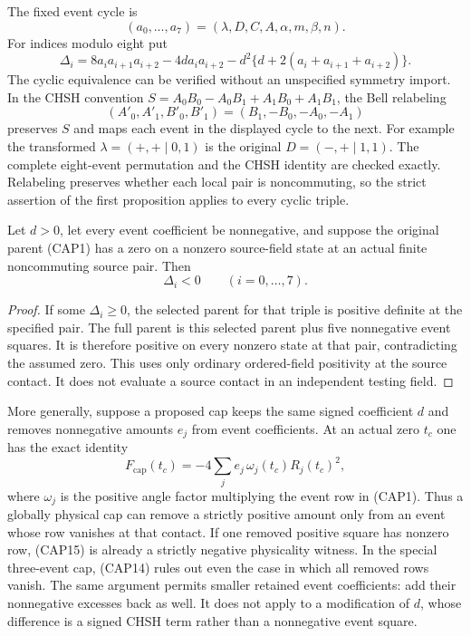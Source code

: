 The fixed event cycle is
\[
(a_0,\ldots,a_7)=(\lambda,D,C,A,\alpha,m,\beta,n).
\]
For indices modulo eight put
\[
\Delta_i=8a_i a_{i+1}a_{i+2}-4d a_i a_{i+2}
 -d^2\{d+2(a_i+a_{i+1}+a_{i+2})\}.
\tag{CAP12}
\]
The cyclic equivalence can be verified without an unspecified symmetry
import.  In the CHSH convention
$S=A_0B_0-A_0B_1+A_1B_0+A_1B_1$, the Bell relabeling
\[
(A'_0,A'_1,B'_0,B'_1)=(B_1,-B_0,-A_0,-A_1)
\tag{CAP13}
\]
preserves $S$ and maps each event in the displayed cycle to the next.
For example the transformed $\lambda=(+,+\mid0,1)$ is the original
$D=(-,+\mid1,1)$.  The complete eight-event permutation and the CHSH
identity are checked exactly.  Relabeling preserves whether each local
pair is noncommuting, so the strict assertion of the first proposition
applies to every cyclic triple.

\begin{theorem}
Let $d>0$, let every event coefficient be nonnegative, and suppose
the original parent (CAP1) has a zero on a nonzero source-field state
at an actual finite noncommuting source pair.  Then
\[
\Delta_i<0\qquad (i=0,\ldots,7).
\tag{CAP14}
\]
\end{theorem}

\begin{proof}
If some $\Delta_i\geq0$, the selected parent for that triple is
positive definite at the specified pair.  The full parent is this
selected parent plus five nonnegative event squares.  It is therefore
positive on every nonzero state at that pair, contradicting the
assumed zero.  This uses only ordinary ordered-field positivity at
the source contact.  It does not evaluate a source contact in an
independent testing field.
\end{proof}

More generally, suppose a proposed cap keeps the same signed coefficient
$d$ and removes nonnegative amounts $e_j$ from event coefficients.
At an actual zero $t_c$ one has the exact identity
\[
F_{\mathrm{cap}}(t_c)
 =-4\sum_j e_j\,\omega_j(t_c)R_j(t_c)^2,
\tag{CAP15}
\]
where $\omega_j$ is the positive angle factor multiplying the event
row in (CAP1).  Thus a globally physical cap can remove a strictly
positive amount only from an event whose row vanishes at that contact.
If one removed positive square has nonzero row, (CAP15) is already a
strictly negative physicality witness.  In the special three-event cap,
(CAP14) rules out even the case in which all removed rows vanish.
The same argument permits smaller retained event coefficients: add
their nonnegative excesses back as well.  It does not apply to a
modification of $d$, whose difference is a signed CHSH term rather
than a nonnegative event square.

